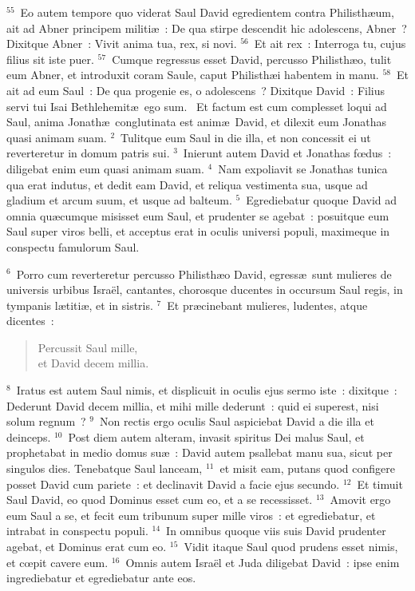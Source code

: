 ${}^{55}$~Eo autem tempore quo viderat Saul David egredientem contra Philisth\ae um, ait ad Abner principem militi\ae~: De qua stirpe descendit hic adolescens, Abner~? Dixitque Abner~: Vivit anima tua, rex, si novi.
${}^{56}$~Et ait rex~: Interroga tu, cujus filius sit iste puer.
${}^{57}$~Cumque regressus esset David, percusso Philisth\ae o, tulit eum Abner, et introduxit coram Saule, caput Philisth\ae i habentem in manu.
${}^{58}$~Et ait ad eum Saul~: De qua progenie es, o adolescens~? Dixitque David~: Filius servi tui Isai Bethlehemit\ae\ ego sum.
~Et factum est cum complesset loqui ad Saul, anima Jonath\ae\ conglutinata est anim\ae\ David, et dilexit eum Jonathas quasi animam suam.
${}^{2}$~Tulitque eum Saul in die illa, et non concessit ei ut reverteretur in domum patris sui.
${}^{3}$~Inierunt autem David et Jonathas fœdus~: diligebat enim eum quasi animam suam.
${}^{4}$~Nam expoliavit se Jonathas tunica qua erat indutus, et dedit eam David, et reliqua vestimenta sua, usque ad gladium et arcum suum, et usque ad balteum.
${}^{5}$~Egrediebatur quoque David ad omnia qu\ae cumque misisset eum Saul, et prudenter se agebat~: posuitque eum Saul super viros belli, et acceptus erat in oculis universi populi, maximeque in conspectu famulorum Saul.


${}^{6}$~Porro cum reverteretur percusso Philisth\ae o David, egress\ae\ sunt mulieres de universis urbibus Isra\"el, cantantes, chorosque ducentes in occursum Saul regis, in tympanis l\ae titi\ae , et in sistris.
${}^{7}$~Et pr\ae cinebant mulieres, ludentes, atque dicentes~: \begin{flushleft}\begin{verse}Percussit Saul mille,\\ et David decem millia.\end{verse}\end{flushleft}


${}^{8}$~Iratus est autem Saul nimis, et displicuit in oculis ejus sermo iste~: dixitque~: Dederunt David decem millia, et mihi mille dederunt~: quid ei superest, nisi solum regnum~?
${}^{9}$~Non rectis ergo oculis Saul aspiciebat David a die illa et deinceps.
${}^{10}$~Post diem autem alteram, invasit spiritus Dei malus Saul, et prophetabat in medio domus su\ae~: David autem psallebat manu sua, sicut per singulos dies. Tenebatque Saul lanceam,
${}^{11}$~et misit eam, putans quod configere posset David cum pariete~: et declinavit David a facie ejus secundo.
${}^{12}$~Et timuit Saul David, eo quod Dominus esset cum eo, et a se recessisset.
${}^{13}$~Amovit ergo eum Saul a se, et fecit eum tribunum super mille viros~: et egrediebatur, et intrabat in conspectu populi.
${}^{14}$~In omnibus quoque viis suis David prudenter agebat, et Dominus erat cum eo.
${}^{15}$~Vidit itaque Saul quod prudens esset nimis, et cœpit cavere eum.
${}^{16}$~Omnis autem Isra\"el et Juda diligebat David~: ipse enim ingrediebatur et egrediebatur ante eos.


